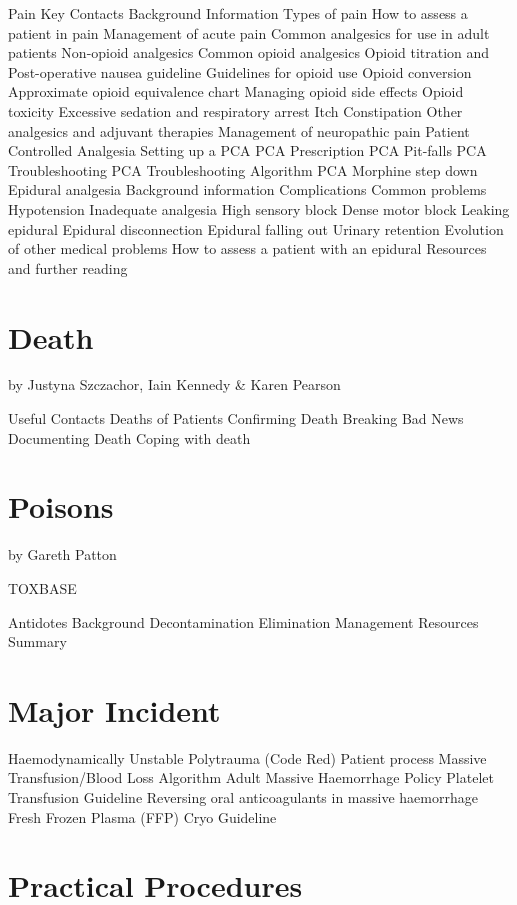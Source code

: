 \documentclass[]{book}
\begin{document}
Pain
Key Contacts
Background Information
Types of pain
How to assess a patient in pain
Management of acute pain
Common analgesics for use in adult patients
Non-opioid analgesics
Common opioid analgesics
Opioid titration and Post-operative nausea guideline
Guidelines for opioid use
Opioid conversion
Approximate opioid equivalence chart
Managing opioid side effects
Opioid toxicity
Excessive sedation and respiratory arrest
Itch
Constipation
Other analgesics and adjuvant therapies
Management of neuropathic pain
Patient Controlled Analgesia
Setting up a PCA
PCA Prescription
PCA Pit-falls
PCA Troubleshooting
PCA Troubleshooting Algorithm
PCA Morphine step down
Epidural analgesia
Background information
Complications
Common problems
Hypotension
Inadequate analgesia
High sensory block
Dense motor block
Leaking epidural
Epidural disconnection
Epidural falling out
Urinary retention
Evolution of other medical problems
How to assess a patient with an epidural
Resources and further reading

\hypertarget{death}{%
\chapter{Death}\label{death}}

by Justyna Szczachor, Iain Kennedy \& Karen Pearson

Useful Contacts
Deaths of Patients
Confirming Death
Breaking Bad News
Documenting Death
Coping with death

\hypertarget{poisions}{%
\chapter{Poisons}\label{poisions}}

by Gareth Patton

TOXBASE

Antidotes
Background
Decontamination
Elimination
Management
Resources
Summary

\hypertarget{majinc}{%
\chapter{Major Incident}\label{majinc}}

Haemodynamically Unstable Polytrauma (Code Red)
Patient process
Massive Transfusion/Blood Loss Algorithm
Adult Massive Haemorrhage Policy
Platelet Transfusion Guideline
Reversing oral anticoagulants in massive haemorrhage
Fresh Frozen Plasma (FFP) Cryo Guideline

\hypertarget{practproc}{%
\chapter{Practical Procedures}\label{practproc}}
\end{document}
